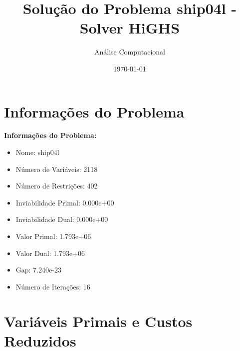 \documentclass[12pt]{article}
\title{Solução do Problema ship04l - Solver HiGHS}
\author{Análise Computacional}
\date{\today}
\begin{document}
\maketitle

\section{Informações do Problema}

\textbf{Informações do Problema:}
\begin{itemize}
\item Nome: ship04l
\item Número de Variáveis: 2118
\item Número de Restrições: 402
\item Inviabilidade Primal: 0.000e+00
\item Inviabilidade Dual: 0.000e+00
\item Valor Primal: 1.793e+06
\item Valor Dual: 1.793e+06
\item Gap: 7.240e-23
\item Número de Iterações: 16
\end{itemize}


\section{Variáveis Primais e Custos Reduzidos}
\end{document}
